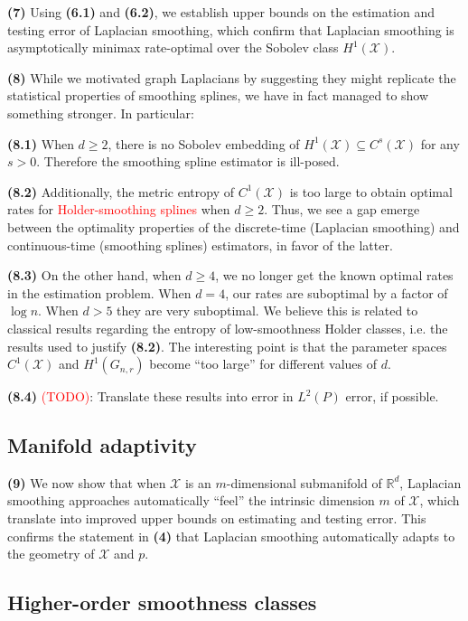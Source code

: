 \documentclass{article}
\newcommand{\Reals}{\mathbb{R}}
\newcommand{\1}{\mathbf{1}}
\newcommand{\Xset}{\mathcal{X}}
\newcommand{\Leb}{L}
\theoremstyle{alden}
\theoremstyle{aldenthm}
\theoremstyle{definition}
\theoremstyle{remark}
\begin{document}
\textbf{(7)} Using \textbf{(6.1)} and \textbf{(6.2)}, we establish upper bounds on the estimation and testing error of Laplacian smoothing, which confirm that Laplacian smoothing is asymptotically minimax rate-optimal over the Sobolev class $H^1(\Xset)$. 

\textbf{(8)} While we motivated graph Laplacians by suggesting they might replicate the statistical properties of smoothing splines, we have in fact managed to show something stronger. In particular:

\quad \textbf{(8.1)} When $d \geq 2$, there is no Sobolev embedding of $H^1(\Xset) \subseteq C^s(\Xset)$ for any $s > 0$. Therefore the smoothing spline estimator is ill-posed.

\quad \textbf{(8.2)} Additionally, the metric entropy of $C^1(\Xset)$ is too large to obtain optimal rates for \textcolor{red}{Holder-smoothing splines} when $d \geq 2$. Thus, we see a gap emerge between the optimality properties of the discrete-time (Laplacian smoothing) and continuous-time (smoothing splines) estimators, in favor of the latter.

\quad \textbf{(8.3)} On the other hand, when $d \geq 4$, we no longer get the known optimal rates in the estimation problem. When $d = 4$, our rates are suboptimal by a factor of $\log n$. When $d > 5$ they are very suboptimal. We believe this is related to classical results regarding the entropy of low-smoothness Holder classes, i.e. the results used to justify \textbf{(8.2)}. The interesting point is that the parameter spaces $C^1(\Xset)$ and $H^1(G_{n,r})$ become ``too large'' for different values of $d$.
 
\quad \textbf{(8.4)} \textcolor{red}{(TODO)}: Translate these results into error in $\Leb^2(P)$ error, if possible. 

\subsection{Manifold adaptivity}

\quad \textbf{(9)} We now show that when $\Xset$ is an $m$-dimensional submanifold of $\Reals^d$, Laplacian smoothing approaches automatically ``feel'' the intrinsic dimension $m$ of $\Xset$, which translate into improved upper bounds on estimating and testing error. This confirms the statement in \textbf{(4)} that Laplacian smoothing automatically adapts to the geometry of $\Xset$ and $p$. 

\subsection{Higher-order smoothness classes}
\end{document}
